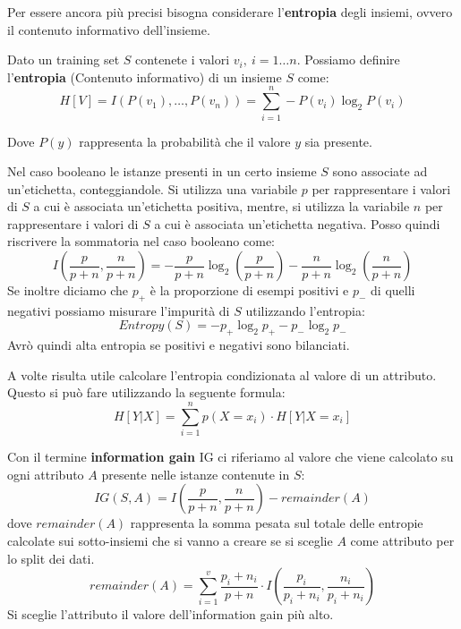 Per essere ancora più precisi bisogna considerare l'\textbf{entropia} degli insiemi,
ovvero il contenuto informativo dell'insieme.
\begin{definizione}
    Dato un training set $S$ contenete i valori $v_i, \ i = 1 \dots n$. Possiamo
    definire l'\textbf{entropia} (Contenuto informativo) di un insieme $S$ come:
    \begin{equation}
        H[V] = I(P(v_1), \dots, P(v_n)) = \sum_{i = 1}^n - P(v_i) \log_{2} P(v_i)
    \end{equation}

    Dove $P(y)$ rappresenta la probabilità che il valore $y$ sia presente.

    Nel caso booleano le istanze presenti in un certo insieme $S$ sono associate
    ad un'etichetta, conteggiandole. Si utilizza una variabile $p$ per rappresentare
    i valori di $S$ a cui è associata un'etichetta positiva, mentre, si utilizza
    la variabile $n$ per rappresentare i valori di $S$ a cui è associata un'etichetta
    negativa. Posso quindi riscrivere la sommatoria nel caso booleano come:
    \begin{equation}
        I\left(\frac{p}{p + n}, \frac{n}{p + n}\right) = -\frac{p}{p + n} \log_2
        \left( \frac{p}{p + n} \right) - \frac{n}{p + n} \log_2 \left(\frac{n}{p
            + n}\right)
    \end{equation}
    Se inoltre diciamo che $p_{+}$ è la proporzione di esempi positivi e $p_{-}$
    di quelli negativi possiamo misurare l'impurità di $S$ utilizzando l'entropia:
    \begin{equation}
        Entropy(S) = - p_{+} \log_2 p_{+} - p_{-} \log_2 p_{-}
    \end{equation}
    Avrò quindi alta entropia se positivi e negativi sono bilanciati.
\end{definizione}

A volte risulta utile calcolare l'entropia condizionata al valore di un attributo.
Questo si può fare utilizzando la seguente formula:
\begin{equation}
    H[Y | X] = \sum_{i = 1}^n p(X = x_i) \cdot H[Y | X = x_i]
\end{equation}

Con il termine \textbf{information gain} IG ci riferiamo al valore che viene
calcolato su ogni attributo $A$ presente nelle istanze contenute in $S$:
\begin{equation}
    IG(S, A) = I\left(\frac{p}{p + n}, \frac{n}{p + n}\right) - remainder(A)
\end{equation}
dove $remainder(A)$ rappresenta la somma pesata sul totale delle entropie calcolate
sui sotto-insiemi che si vanno a creare se si sceglie $A$ come attributo per lo
split dei dati.
\begin{equation}
    remainder(A) = \sum_{i=1}^v \frac{p_i + n_i}{p + n} \cdot I\left(\frac{p_i}
    {p_i + n_i}, \frac{n_i}{p_i + n_i}\right)
\end{equation}
Si sceglie l'attributo il valore dell'information gain più alto.

